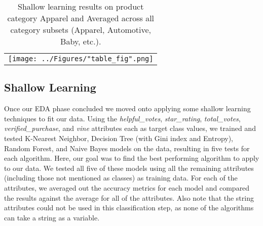 \documentclass[10pt, conference, compsocconf]{IEEEtran}
\begin{document}
\begin{center}
	\begin{table*}[!]
		\centering \footnotesize
		\vspace{0.01cm}
		\caption{Shallow learning results on product category Apparel and Averaged across all category subsets (Apparel, Automotive, Baby, etc.).}
		\hspace{1cm}
		\begin{tabular}{c}
			\texttt{[image: ../Figures/"table\_fig".png]}\\
		\end{tabular}\newline
		\vspace{-0.05cm}
		\label{Table2}
	\end{table*} \hfil
\end{center} \vspace{-6mm}

\subsection{Shallow Learning}


Once our EDA phase concluded we moved onto applying some shallow learning techniques to fit our data. Using the \textit{helpful\_votes}, \textit{star\_rating}, \textit{total\_votes}, \textit{verified\_purchase}, and \textit{vine} attributes each as target class values, we trained and tested K-Nearest Neighbor, Decision Tree (with Gini index and Entropy), Random Forest, and Naive Bayes models on the data, resulting in five tests for each algorithm. Here, our goal was to find the best performing algorithm to apply to our data. We tested all five of these models using all the remaining attributes (including those not mentioned as classes) as training data. For each of the attributes, we averaged out the accuracy metrics for each model and compared the results against the average for all of the attributes. Also note that the string attributes could not be used in this classification step, as none of the algorithms can take a string as a variable. 
\end{document}
